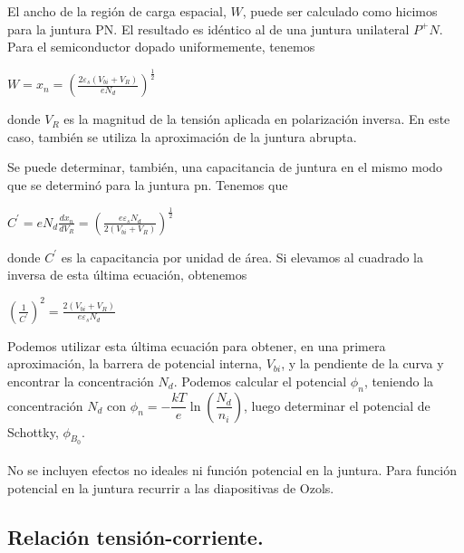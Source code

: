 \documentclass[oneside]{book}
\numberwithin{equation}{section}
\numberwithin{figure}{section}
\numberwithin{table}{section}
\begin{document}
			El ancho de la región de carga espacial, $W$, puede ser calculado como hicimos para la juntura PN. El resultado es idéntico al de una juntura unilateral $P^+N$. Para el semiconductor dopado uniformemente, tenemos
			
			\begin{center}
				$W=x_n=\left( \frac{2 \varepsilon_s (V_{bi}+V_R)}{eN_d} \right)^{\frac{1}{2}}$
			\end{center}
			
			donde $V_R$ es la magnitud de la tensión aplicada en polarización inversa. En este caso, también se utiliza la aproximación de la juntura abrupta.

			Se puede determinar, también, una capacitancia de juntura en el mismo modo que se determinó para la juntura pn. Tenemos que
			
			\begin{center}
				$C^\prime=eN_d \frac{dx_n}{dV_R}=\left( \frac{e \varepsilon_s N_d}{2 (V_{bi}+V_R)} \right)^{\frac{1}{2}}$
			\end{center}
			
			donde $C^\prime$ es la capacitancia por unidad de área. Si elevamos al cuadrado la inversa de esta última ecuación, obtenemos
			
			\begin{center}
				$\left( \frac{1}{C^\prime} \right)^2=\frac{2(V_{bi}+V_R)}{e \varepsilon_s N_d}$
			\end{center}
			
			Podemos utilizar esta última ecuación para obtener, en una primera aproximación, la barrera de potencial interna, $V_{bi}$, y la pendiente de la curva y encontrar la concentración $N_d$. Podemos calcular el potencial $\phi _n$, teniendo la concentración $N_d$ con $\phi_n=-\dfrac{kT}{e} \ln \left( \dfrac{N_d}{n_i} \right)$, luego determinar el potencial de Schottky, $\phi_{B_0}$.

			\paragraph{}

				\scriptsize No se incluyen efectos no ideales ni función potencial en la juntura. Para función potencial en la juntura recurrir a las diapositivas de Ozols.

			\normalsize

			\subsection{Relación tensión-corriente.}
\end{document}
